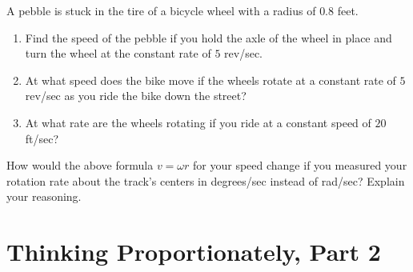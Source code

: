 \documentclass{ximera}
\begin{document}
\begin{question} \label{Qdsfdsf4rt5yy55t}
A pebble is stuck in the tire of a bicycle wheel with a radius of $0.8$ feet. 
\begin{enumerate}
\item Find the speed of the pebble if you hold the axle of the wheel in place and turn the wheel at the constant rate of $5$ rev/sec.

\item At what speed does the bike move if the wheels rotate at a constant rate of $5$ rev/sec as you ride the bike down the street?

\item At what rate are the wheels rotating if you ride at a constant speed of $20$ ft/sec?

\end{enumerate}

\end{question}




\begin{question}  \label{Q2455: Angles}
How would the above formula $v=\omega r$ for your speed change if you measured your rotation rate about the track's centers in degrees/sec instead of rad/sec? Explain your reasoning.

\end{question}



\section{Thinking Proportionately, Part 2}
\end{document}
